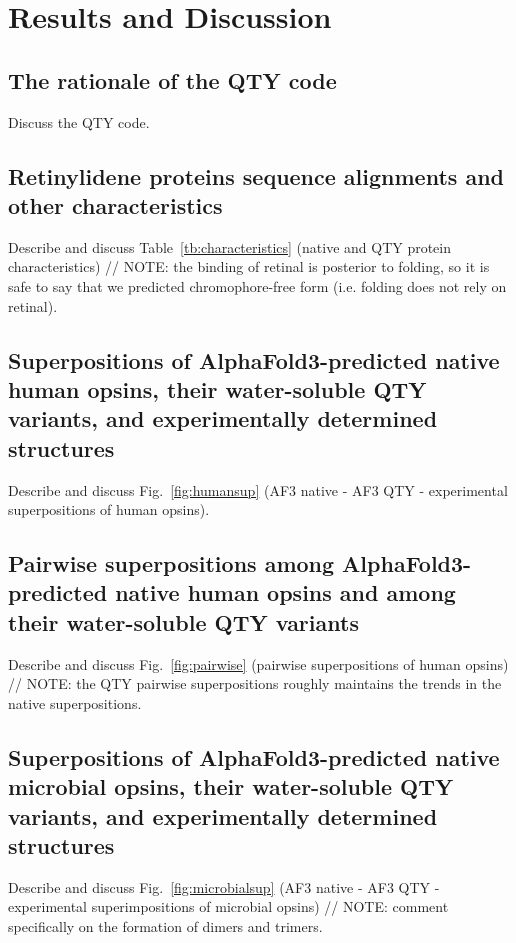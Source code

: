 \documentclass[fleqn,10pt]{manuscript}
\begin{document}
\section*{Results and Discussion}

\subsection*{The rationale of the QTY code}

Discuss the QTY code. 

\subsection*{Retinylidene proteins sequence alignments and other characteristics}

Describe and discuss Table~\ref{tb:characteristics} (native and QTY protein characteristics) // NOTE: the binding of retinal is posterior to folding, so it is safe to say that we predicted chromophore-free form (i.e. folding does not rely on retinal). 

\subsection*{Superpositions of AlphaFold3-predicted native human opsins, their water-soluble QTY variants, and experimentally determined structures}

Describe and discuss Fig.~\ref{fig:humansup} (AF3 native - AF3 QTY - experimental superpositions of human opsins). 

\subsection*{Pairwise superpositions among AlphaFold3-predicted native human opsins and among their water-soluble QTY variants}

Describe and discuss Fig.~\ref{fig:pairwise} (pairwise superpositions of human opsins) // NOTE: the QTY pairwise superpositions roughly maintains the trends in the native superpositions. 

\subsection*{Superpositions of AlphaFold3-predicted native microbial opsins, their water-soluble QTY variants, and experimentally determined structures}

Describe and discuss Fig.~\ref{fig:microbialsup} (AF3 native - AF3 QTY - experimental superimpositions of microbial opsins) // NOTE: comment specifically on the formation of dimers and trimers. 
\end{document}
